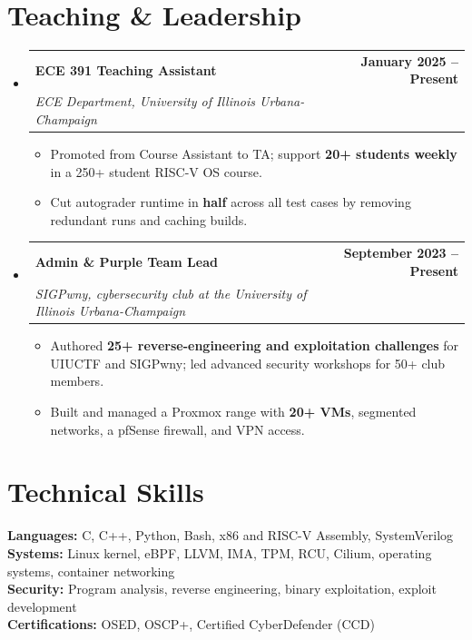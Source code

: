 \documentclass[letterpaper,11pt]{article}
\makeatletter
\newcommand{\resumeItem}[1]{
  \item\small{#1 \vspace{-2pt}}
}
\newcommand{\resumeSubheading}[4]{
  \vspace{-2pt}\item
    \begin{tabular*}{1.0\textwidth}[t]{l@{\extracolsep{\fill}}r}
      \textbf{#1} & \textbf{\small #2} \\
      \textit{\small #3} & \textit{\small #4} \\
    \end{tabular*}\vspace{-7pt}
}
\newcommand{\resumeSubHeadingListStart}{\begin{itemize}[leftmargin=0in,label={}]}
\newcommand{\resumeSubHeadingListEnd}{\end{itemize}}
\newcommand{\resumeItemListStart}{\begin{itemize}}
\newcommand{\resumeItemListEnd}{\end{itemize}\vspace{-5pt}}
\makeatother
\begin{document}
\section{Teaching \& Leadership}
\resumeSubHeadingListStart
  \resumeSubheading
    {ECE 391 Teaching Assistant}{January 2025 -- Present}
    {ECE Department, University of Illinois Urbana-Champaign}{}
  \resumeItemListStart
    \resumeItem{Promoted from Course Assistant to TA; support \textbf{20+ students weekly} in a 250+ student RISC-V OS course.}
    \resumeItem{Cut autograder runtime in \textbf{half} across all test cases by removing redundant runs and caching builds.}
  \resumeItemListEnd

  \resumeSubheading
    {Admin \& Purple Team Lead}{September 2023 -- Present}
    {SIGPwny, cybersecurity club at the University of Illinois Urbana-Champaign}{}
  \resumeItemListStart
    \resumeItem{Authored \textbf{25+ reverse-engineering and exploitation challenges} for UIUCTF and SIGPwny; led advanced security workshops for 50+ club members.}
    \resumeItem{Built and managed a Proxmox range with \textbf{20+ VMs}, segmented networks, a pfSense firewall, and VPN access.}
  \resumeItemListEnd
\resumeSubHeadingListEnd

\section{Technical Skills}
\begin{itemize}[leftmargin=0.15in,label={}]
  \small{\item{
    \textbf{Languages:} C, C++, Python, Bash, x86 and RISC-V Assembly, SystemVerilog \\
    \textbf{Systems:} Linux kernel, eBPF, LLVM, IMA, TPM, RCU, Cilium, operating systems, container networking \\
    \textbf{Security:} Program analysis, reverse engineering, binary exploitation, exploit development \\
    \textbf{Certifications:} OSED, OSCP+, Certified CyberDefender (CCD)
  }}
\end{itemize}
\vspace{-16pt}
\end{document}
